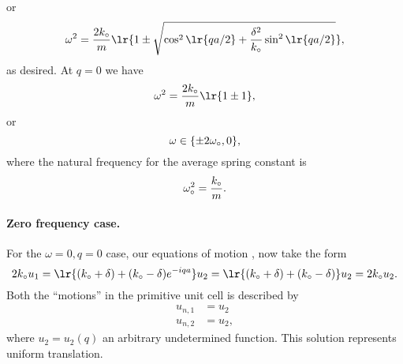 {%
%
or
\begin{dmath}\label{eqn:condensedMatterProblemSet4Problem2:280}
\omega^2 =
\frac{2 k_\nought }{m} \lr{ 1
\pm
\sqrt{
\cos^2 \lr{ q a /2 }
+
\frac{\delta^2}{k_\nought} \sin^2 \lr{ q a /2 }
}
},
\end{dmath}
%
as desired.
At \(q = 0\) we have
%
\begin{equation}\label{eqn:condensedMatterProblemSet4Problem2:400}
\omega^2 = \frac{2 k_\nought }{m} \lr{ 1 \pm 1 },
\end{equation}
%
or
\begin{equation}\label{eqn:condensedMatterProblemSet4Problem2:420}
\omega \in \{ \pm 2 \omega_\circ, 0 \},
\end{equation}
%
where the natural frequency for the average spring constant is
%
\begin{equation}\label{eqn:condensedMatterProblemSet4Problem2:580}
\omega_\circ^2 = \frac{k_\circ}{m}.
\end{equation}
%
\paragraph{Zero frequency case.}
%
For the \(\omega = 0, q = 0\) case, our equations of motion
, now take the form
%
\begin{dmath}\label{eqn:condensedMatterProblemSet4Problem2:440}
2 k_\nought u_1
=
\lr{
 (k_\nought + \delta)
+ (k_\nought - \delta)
e^{ -i q a }
}
u_2
=
\lr{
 (k_\nought + \delta)
+ (k_\nought - \delta)
}
u_2
=
2 k_\nought u_2.
\end{dmath}
%
Both the ``motions'' in the primitive unit cell is described by
%
\begin{equation}\label{eqn:condensedMatterProblemSet4Problem2:620}
\begin{aligned}
u_{n, 1} &= u_2 \\
u_{n, 2} &= u_2,
\end{aligned}
\end{equation}
%
where \(u_2 = u_2(q)\) an arbitrary undetermined function.  This solution represents uniform translation.

%
%
%
%
%
}
